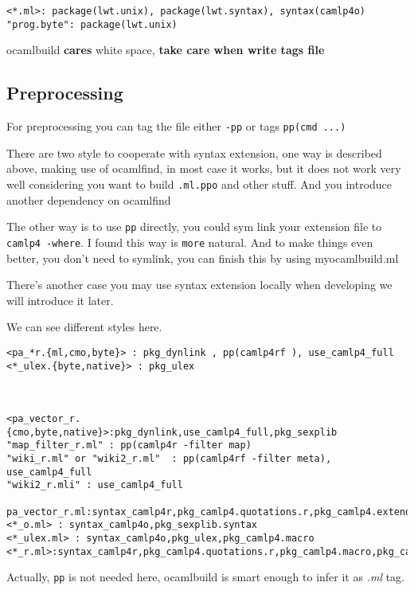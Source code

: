 \documentclass[11pt]{article}
\begin{document}
\begin{verbatim}
<*.ml>: package(lwt.unix), package(lwt.syntax), syntax(camlp4o)
"prog.byte": package(lwt.unix)
\end{verbatim}

    ocamlbuild \textbf{cares} white space, \textbf{take care when write tags file}
   
\subsection*{Preprocessing}
\label{sec-1-11}

   For preprocessing you can tag the file either \texttt{-pp} or tags \texttt{pp(cmd    ...)}

   There are two style to cooperate with syntax extension, one way is
   described above, making use of ocamlfind, in most case it works,
   but it does not work very well considering you want to build
   \texttt{.ml.ppo} and other stuff. And you introduce another dependency on
   ocamlfind

   The other way is to use \texttt{pp} directly, you could sym link your
   extension file to \texttt{camlp4 -where}. I found this way is \texttt{more}
   natural. And to make things even better, you don't need to symlink,
   you can finish this by using myocamlbuild.ml

   There's another case you may use syntax extension
   locally when developing  we will introduce it later.

   We can see different styles here.



\begin{verbatim}
<pa_*r.{ml,cmo,byte}> : pkg_dynlink , pp(camlp4rf ), use_camlp4_full
<*_ulex.{byte,native}> : pkg_ulex 



<pa_vector_r.{cmo,byte,native}>:pkg_dynlink,use_camlp4_full,pkg_sexplib 
"map_filter_r.ml" : pp(camlp4r -filter map)
"wiki_r.ml" or "wiki2_r.ml"  : pp(camlp4rf -filter meta), use_camlp4_full
"wiki2_r.mli" : use_camlp4_full

pa_vector_r.ml:syntax_camlp4r,pkg_camlp4.quotations.r,pkg_camlp4.extend,pkg_sexplib.syntax
<*_o.ml> : syntax_camlp4o,pkg_sexplib.syntax
<*_ulex.ml> : syntax_camlp4o,pkg_ulex,pkg_camlp4.macro  
<*_r.ml>:syntax_camlp4r,pkg_camlp4.quotations.r,pkg_camlp4.macro,pkg_camlp4.extend
\end{verbatim}

   Actually, \texttt{pp} is not needed here, ocamlbuild is smart
   enough to infer it as \emph{.ml} tag.
\end{document}
